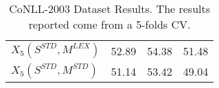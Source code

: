 \begin{table}[]
\begin{tabular}{@{}llll@{}}
%
$X_5(S^{STD}, M^{LEX})$  & 52.89           & 54.38            & 51.48           \\ 
$X_5(S^{STD}, M^{STD})$  &51.14	&53.42	&49.04            \\  \bottomrule
\end{tabular}
\caption{CoNLL-2003 Dataset Results. The results reported come from a 5-folds CV.}
\label{tab:wikigold}
\end{table}

